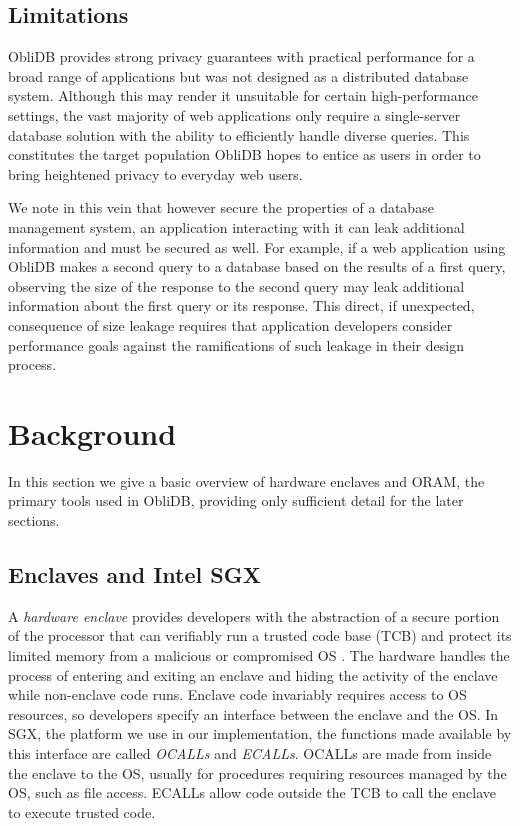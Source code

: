 \documentclass[letterpaper,twocolumn,10pt]{article}
\def\name/{ObliDB}
\begin{document}
\subsection{Limitations}
\name/ provides strong privacy guarantees with practical performance for a broad range of applications but was not designed as a distributed database system. Although this may render it unsuitable for certain high-performance settings, the vast majority of web applications only require a single-server database solution with the ability to efficiently handle diverse queries. This constitutes the target population \name/ hopes to entice as users in order to bring heightened privacy to everyday web users.

We note in this vein that however secure the properties of a database management system, an application interacting with it can leak additional information and must be secured as well. For example, if a web application using \name/ makes a second query to a database based on the results of a first query, observing the size of the response to the second query may leak additional information about the first query or its response. This direct, if unexpected, consequence of size leakage requires that application developers consider performance goals against the ramifications of such leakage in their design process.

\section{Background}\label{background}
In this section we give a basic overview of hardware enclaves and ORAM, the primary tools used in \name/, providing only sufficient detail for the later sections.

\subsection{Enclaves and Intel SGX}

A \emph{hardware enclave} provides developers with the abstraction of a secure portion of the processor that can verifiably run a trusted code base (TCB) and protect its limited memory from a malicious or compromised OS \cite{CD16, SGXRef}. The hardware handles the process of entering and exiting an enclave and hiding the activity of the enclave while non-enclave code runs. Enclave code invariably requires access to OS resources, so developers specify an interface between the enclave and the OS. In SGX, the platform we use in our implementation, the functions made available by this interface are called \textit{OCALLs} and \textit{ECALLs}. OCALLs are made from inside the enclave to the OS, usually for procedures requiring resources managed by the OS, such as file access. ECALLs allow code outside the TCB to call the enclave to execute trusted code.
\end{document}
